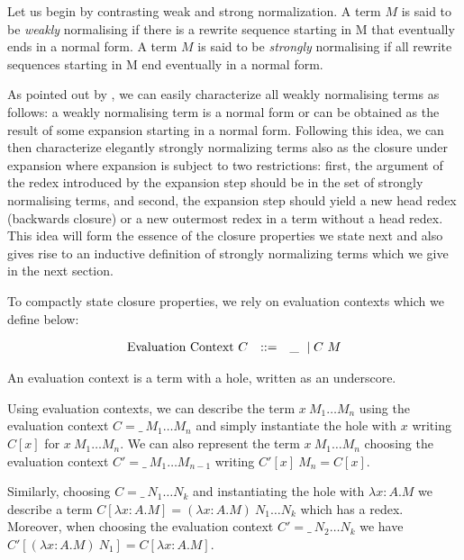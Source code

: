 \documentclass{article}
\begin{document}

Let us begin by contrasting weak and strong normalization. A term $M$ is said to be \emph{weakly} normalising if there is a  rewrite sequence starting in M that eventually ends in a  normal form. A  term $M$ is said to be \emph{strongly} normalising if all rewrite sequences starting in M end eventually in a  normal form.

As pointed out by \cite{Raamsdonk_onnormalisation}, we can easily characterize all weakly normalising terms as follows: a  weakly normalising term is a normal form or can be obtained as the result of some expansion starting in a  normal form. Following this idea, we can then characterize elegantly strongly normalizing terms also as the closure under expansion where expansion is subject to two restrictions: first, the argument of the redex introduced by the expansion step should be in the set of strongly normalising terms, and second, the expansion step should yield a new head redex (backwards closure) or a  new outermost redex in a  term without a  head redex. This idea will form the essence of the closure properties we state next and also gives rise to an inductive definition of strongly normalizing terms which we give in the next section.

To compactly state closure properties, we rely on evaluation contexts which we define below:

\[
\begin{array}{lcl}
\mbox{Evaluation Context}~C & \mathrel{::=} & {\_} ~\mid C~M
\end{array}
\]

An evaluation context is a term with a hole, written as an underscore.

Using evaluation contexts, we can describe the term $x~M_1 \ldots M_n$ using the evaluation context $C = \_~M_1 \ldots M_n$ and simply instantiate the hole with $x$ writing $C[x]$ for $x~M_1 \ldots M_n$. We can also represent the term $x~M_1 \ldots M_n$ choosing the evaluation context $C' = \_~M_1 \ldots M_{n-1}$ writing $C'[x]~M_n = C[x]$.

Similarly, choosing $C = \_ ~N_1 \ldots N_k$ and instantiating the hole with $\lambda x{:}A.M$ we describe a term $C[\lambda x{:}A.M] = (\lambda x{:}A.M)~N_1 \ldots N_k$ which has a redex. Moreover, when choosing the evaluation context $C' = \_~N_2 \ldots N_k$ we have $C'[(\lambda x{:}A.M)~N_1] = C[\lambda x{:}A.M]$.
\end{document}
